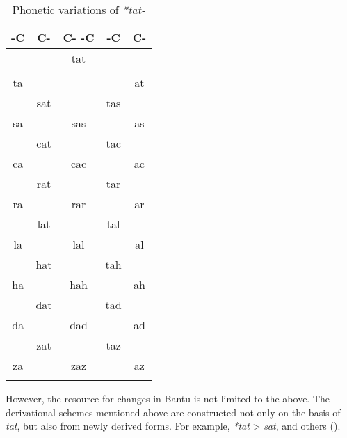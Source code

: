 \begin{table}
\caption{\label{tab:4:7}Phonetic variations of \textit{*tat-}} 


\begin{tabularx}{.4\textwidth}{ccCcc}
\lsptoprule

-C & C- & C- -C & -C & C-\\
\midrule
&  & tat &  & \\
&  &  &  & \\
ta &  &  &  & at\\
& sat &  & tas & \\
sa &  & sas &  & as\\
& cat &  & tac & \\
ca &  & cac &  & ac\\
& rat &  & tar & \\
ra &  & rar &  & ar\\
& lat &  & tal & \\
la &  & lal &  & al\\
& hat &  & tah & \\
ha &  & hah &  & ah\\
& dat &  & tad & \\
da &  & dad &  & ad\\
& zat &  & taz & \\
za &  & zaz &  & az\\
\lspbottomrule
\end{tabularx}
\end{table}

However, the resource for changes in Bantu is not limited to the above. The derivational schemes mentioned above are constructed not only on the basis of \textit{tat}, but also from newly derived forms. For example, \textit{*tat} > \textit{sat}, and others ().

